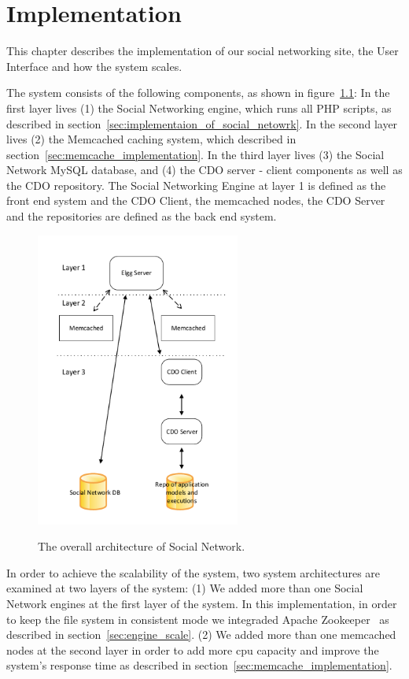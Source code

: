 
\chapter{Implementation}
\label{chap:implementation}
This chapter describes the implementation of our social networking site, the User Interface and how the system scales.

The system consists of the following components, as shown in figure~\ref{fig:system_architecture}: In the first layer lives (1) the Social Networking engine, which runs all PHP scripts, as described in section~\ref{sec:implementaion_of_social_netowrk}. 
In the second layer lives (2) the Memcached caching system, which described in section~\ref{sec:memcache_implementation}. 
In the third layer lives (3) the Social Network MySQL database, and (4) the CDO server - client components as well as the CDO repository. The Social Networking Engine at layer 1 is defined as the front end system and the CDO Client, the memcached nodes, the CDO Server and the repositories are defined as the back end system. 

\begin{figure}[h]
	\caption{The overall architecture of Social Network.}
	\includegraphics[width=0.6\textwidth,natwidth=200,natheight=150]{./fig/system_architecture.pdf}
	\centering
	\label{fig:system_architecture}
\end{figure}

In order to achieve the scalability of the system, two system architectures are examined at two layers of the system: (1) We added more than one Social Network engines at the first layer of the system. In this implementation, in order to keep the file system in consistent mode we integraded Apache Zookeeper~\cite{zookeeper_url} as described in section~\ref{sec:engine_scale}. (2) We added more than one memcached nodes at the second layer in order to add more cpu capacity and improve the system's response time as described in section~\ref{sec:memcache_implementation}.

